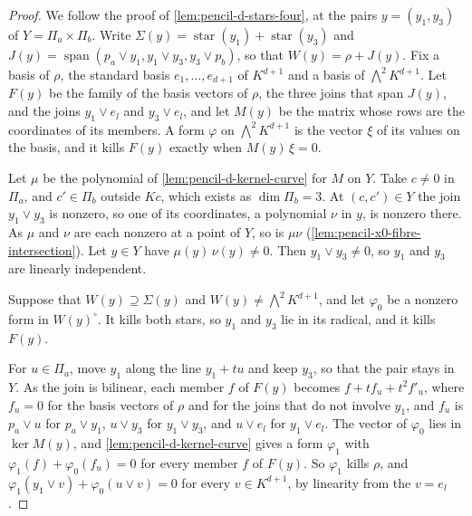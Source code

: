 \begin{proof}
  \leanok
  We follow the proof of \cref{lem:pencil-d-stars-four}, at the pairs
  $y = (y_1, y_3)$ of $Y = \Pi_a \times \Pi_b$. Write
  $\Sigma(y) = \operatorname{star}(y_1) + \operatorname{star}(y_3)$ and
  $J(y) = \operatorname{span}(p_a \vee y_1, y_1 \vee y_3, y_3 \vee p_b)$,
  so that $W(y) = \rho + J(y)$. Fix a basis of $\rho$, the standard basis
  $e_1, \dots, e_{d+1}$ of $K^{d+1}$ and a basis of
  $\bigwedge^2 K^{d+1}$. Let $F(y)$ be the family of the basis vectors of
  $\rho$, the three joins that span $J(y)$, and the joins
  $y_1 \vee e_l$ and $y_3 \vee e_l$, and let $M(y)$ be the matrix whose
  rows are the coordinates of its members. A form $\varphi$ on
  $\bigwedge^2 K^{d+1}$ is the vector $\xi$ of its values on the basis,
  and it kills $F(y)$ exactly when $M(y)\, \xi = 0$.

  Let $\mu$ be the polynomial of \cref{lem:pencil-d-kernel-curve} for $M$
  on $Y$. Take $c \neq 0$ in $\Pi_a$, and $c' \in \Pi_b$ outside $K c$,
  which exists as $\dim \Pi_b = 3$. At $(c, c') \in Y$ the join
  $y_1 \vee y_3$ is nonzero, so one of its coordinates, a polynomial
  $\nu$ in $y$, is nonzero there. As $\mu$ and $\nu$ are each nonzero at
  a point of $Y$, so is $\mu \nu$
  (\cref{lem:pencil-x0-fibre-intersection}). Let $y \in Y$ have
  $\mu(y)\, \nu(y) \neq 0$. Then $y_1 \vee y_3 \neq 0$, so $y_1$ and $y_3$
  are linearly independent.

  Suppose that $W(y) \supseteq \Sigma(y)$ and
  $W(y) \neq \bigwedge^2 K^{d+1}$, and let $\varphi_0$ be a nonzero form
  in $W(y)^{\circ}$. It kills both stars, so $y_1$ and $y_3$ lie in its
  radical, and it kills $F(y)$.

  For $u \in \Pi_a$, move $y_1$ along the line $y_1 + tu$ and keep $y_3$,
  so that the pair stays in $Y$. As the join is bilinear, each member $f$
  of $F(y)$ becomes $f + t f_u + t^2 f'_u$, where $f_u = 0$ for the basis
  vectors of $\rho$ and for the joins that do not involve $y_1$, and
  $f_u$ is $p_a \vee u$ for $p_a \vee y_1$, $u \vee y_3$ for
  $y_1 \vee y_3$, and $u \vee e_l$ for $y_1 \vee e_l$. The vector of
  $\varphi_0$ lies in $\ker M(y)$, and \cref{lem:pencil-d-kernel-curve}
  gives a form $\varphi_1$ with $\varphi_1(f) + \varphi_0(f_u) = 0$ for
  every member $f$ of $F(y)$. So $\varphi_1$ kills $\rho$, and
  $\varphi_1(y_1 \vee v) + \varphi_0(u \vee v) = 0$ for every
  $v \in K^{d+1}$, by linearity from the $v = e_l$.


\end{proof}
